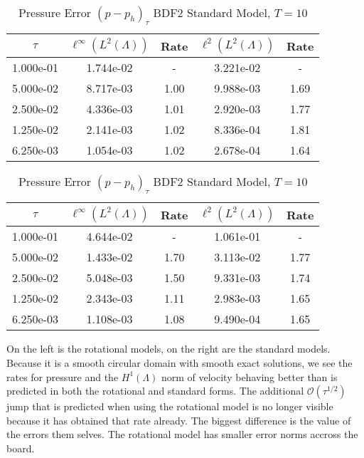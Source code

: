 \documentclass[letterpaper]{erdc}
\begin{document}
\begin{table}[h!]
  \parbox{.45\linewidth}{
  \tiny
  \centering
    \caption{Pressure Error $(p - p_h)_{\tau}$ BDF2 Rotational Model, $T=10$}
    \begin{tabular}{c|c|c|c|c}
      $\tau$ &  $\ell^{\infty}\left(L^2(\Lambda)\right)$ &  Rate  &  $\ell^2\left(L^2(\Lambda)\right)$  &  Rate\\
      \hline
      1.000e-01 & 1.744e-02 &  -   & 3.221e-02 &  -  \\
      5.000e-02 & 8.717e-03 & 1.00 & 9.988e-03 & 1.69\\
      2.500e-02 & 4.336e-03 & 1.01 & 2.920e-03 & 1.77\\
      1.250e-02 & 2.141e-03 & 1.02 & 8.336e-04 & 1.81\\
      6.250e-03 & 1.054e-03 & 1.02 & 2.678e-04 & 1.64
    \end{tabular}
    }
    \hfill
    \parbox{.45\linewidth}{
    \tiny
    \centering
      \caption{Pressure Error $(p - p_h)_{\tau}$ BDF2 Standard Model, $T=10$}
      \begin{tabular}{c|c|c|c|c}\label{table:lastconvergenceresult}
        $\tau$ &  $\ell^{\infty}\left(L^2(\Lambda)\right)$ &  Rate  &  $\ell^2\left(L^2(\Lambda)\right)$  &  Rate\\
        \hline
        1.000e-01 & 4.644e-02 &   -  & 1.061e-01 &   - \\
        5.000e-02 & 1.433e-02 & 1.70 & 3.113e-02 & 1.77\\
        2.500e-02 & 5.048e-03 & 1.50 & 9.331e-03 & 1.74\\
        1.250e-02 & 2.343e-03 & 1.11 & 2.983e-03 & 1.65\\
        6.250e-03 & 1.108e-03 & 1.08 & 9.490e-04 & 1.65
      \end{tabular}
    }
\end{table}


On the left is the rotational models,  on the right are the standard models.  Because it is a smooth circular domain with smooth exact solutions, we see the rates for pressure and the $H^1(\Lambda)$ norm of velocity behaving better than is predicted in both the rotational and standard forms.  The additional $\mathcal{O}(\tau^{1/2})$ jump that is predicted when using the rotational model is no longer visible because it has obtained that rate already.  The biggest difference is the value of the errors them selves.  The rotational model has smaller error norms accross the board.
\end{document}
